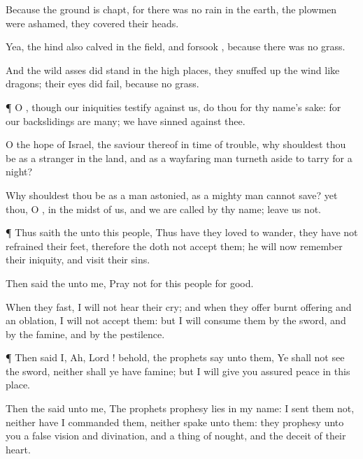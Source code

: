 {Because the
ground is
chapt, for there was no
rain in the
earth, the
plowmen were
ashamed, they
covered their
heads.

Yea, the
hind also
calved in the
field, and
forsook
{}, because there was no
grass.

And the wild
asses did
stand in the high
places, they snuffed
up the
wind like
dragons; their
eyes did
fail, because
{} no
grass.


\par }{\PP {}¶ O
{}, though our
iniquities
testify against us,
do thou
{} for thy
name’s sake: for our
backslidings are
many; we have
sinned against thee.

O the
hope of
Israel, the
saviour thereof in
time of
trouble, why shouldest thou be as a
stranger in the
land, and as a wayfaring
man
{} turneth
aside to tarry for a
night?

Why shouldest thou be as a
man
astonied, as a mighty
man
{}
cannot
save? yet thou, O
{},
{} in the
midst of us, and we are
called by thy
name;
leave us not.


\par }{\PP {}¶ Thus
saith the
{} unto this
people, Thus have they
loved to
wander, they have not
refrained their
feet, therefore the
{} doth not
accept them; he will now
remember their
iniquity, and
visit their
sins.

Then
said the
{} unto me,
Pray not for this
people for
{}
good.

When they
fast, I will not
hear their
cry; and when they
offer burnt
offering and an
oblation, I will not
accept them: but I will
consume them by the
sword, and by the
famine, and by the
pestilence.


\par }{\PP {}¶ Then
said I,
Ah,
Lord
{}! behold, the
prophets
say unto them, Ye shall not
see the
sword, neither shall ye have
famine; but I will
give you
assured
peace in this
place.

Then the
{}
said unto me, The
prophets
prophesy
lies in my
name: I
sent them not, neither have I
commanded them, neither
spake unto them: they
prophesy unto you a
false
vision and
divination, and a thing of
nought, and the
deceit of their
heart.

}
